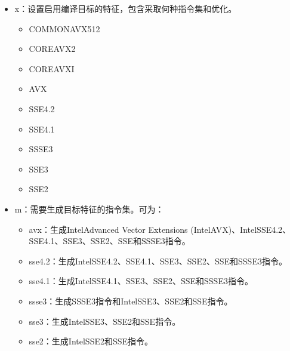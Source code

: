\documentclass[a4paper,12pt,english]{sphinxmanual}
\begin{document}
\begin{itemize}
\item {} 
\sphinxAtStartPar
\sphinxhyphen{}x：设置启用编译目标的特征，包含采取何种指令集和优化。
\begin{itemize}
\item {} 
\sphinxAtStartPar
COMMON\sphinxhyphen{}AVX512

\item {} 
\sphinxAtStartPar
CORE\sphinxhyphen{}AVX2

\item {} 
\sphinxAtStartPar
CORE\sphinxhyphen{}AVX\sphinxhyphen{}I

\item {} 
\sphinxAtStartPar
AVX

\item {} 
\sphinxAtStartPar
SSE4.2

\item {} 
\sphinxAtStartPar
SSE4.1

\item {} 
\sphinxAtStartPar
SSSE3

\item {} 
\sphinxAtStartPar
SSE3

\item {} 
\sphinxAtStartPar
SSE2

\end{itemize}

\item {} 
\sphinxAtStartPar
\sphinxhyphen{}m：需要生成目标特征的指令集。可为：
\begin{itemize}
\item {} 
\sphinxAtStartPar
avx：生成IntelAdvanced Vector Extensions (IntelAVX)、IntelSSE4.2、SSE4.1、SSE3、SSE2、SSE和SSSE3指令。

\item {} 
\sphinxAtStartPar
sse4.2：生成IntelSSE4.2、SSE4.1、SSE3、SSE2、SSE和SSSE3指令。

\item {} 
\sphinxAtStartPar
sse4.1：生成IntelSSE4.1、SSE3、SSE2、SSE和SSSE3指令。

\item {} 
\sphinxAtStartPar
ssse3：生成SSSE3指令和IntelSSE3、SSE2和SSE指令。

\item {} 
\sphinxAtStartPar
sse3：生成IntelSSE3、SSE2和SSE指令。

\item {} 
\sphinxAtStartPar
sse2：生成IntelSSE2和SSE指令。


\end{itemize}
\end{itemize}
\end{document}
